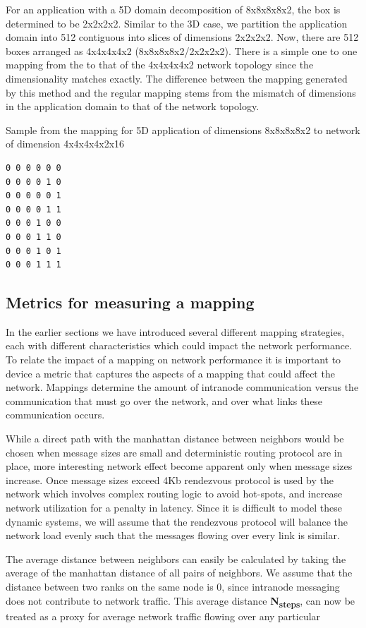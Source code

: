 \documentclass{acm_proc_article-sp}
\begin{document}
For an application with a 5D domain decomposition of 8x8x8x8x2, the box is determined to be 2x2x2x2. Similar to the 3D case, we
partition the application domain into 512 contiguous into  slices of dimensions 2x2x2x2.
Now, there are 512 boxes arranged as 4x4x4x4x2 (8x8x8x8x2/2x2x2x2). There is a simple one to one mapping from the
to that of the 4x4x4x4x2 network topology since the dimensionality matches exactly. The difference between the mapping
generated by this method and the regular mapping stems from the mismatch of dimensions in the application domain to that
of the network topology.

Sample from the mapping for 5D application of dimensions 8x8x8x8x2 to network of dimension 4x4x4x4x2x16
\begin{lstlisting}[frame=lines, basicstyle=\ttfamily,columns=fixed]
0 0 0 0 0 0
0 0 0 0 1 0
0 0 0 0 0 1
0 0 0 0 1 1
0 0 0 1 0 0
0 0 0 1 1 0
0 0 0 1 0 1
0 0 0 1 1 1
\end{lstlisting}

\subsection{Metrics for measuring a mapping}

In the earlier sections we have introduced several different mapping strategies, each with different characteristics which could
impact the network performance. To relate the impact of a mapping on network performance it is important to device a metric that
captures the aspects of a mapping that could affect the network. Mappings determine the amount of intranode communication versus
the communication that must go over the network, and over what links these communication occurs.

While a direct path with the manhattan distance between neighbors would be chosen when message sizes are small and deterministic routing
protocol are in place, more interesting network effect become apparent only when message sizes increase. Once message sizes exceed 4Kb
rendezvous protocol is used by the network which involves complex routing logic to avoid hot-spots, and increase network utilization for
a penalty in latency. Since it is difficult to model these dynamic systems, we will assume that the rendezvous protocol will balance
the network load evenly such that the messages flowing over every link is similar.


The average distance between neighbors can easily be calculated by taking the average of the manhattan distance of all pairs of neighbors.
We assume that the distance between two ranks on the same node is 0, since intranode messaging does not contribute to network traffic.
This average distance \textbf{N\textsubscript{steps}}, can now be treated as a proxy for average network traffic flowing over any particular 
\end{document}
